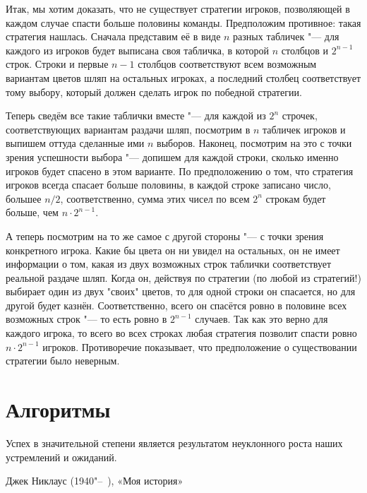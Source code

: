 \documentclass[twoside]{book}
\begin{document}
Итак, мы хотим доказать, что не существует стратегии игроков, позволяющей в каждом случае спасти больше половины команды.
Предположим противное: такая стратегия нашлась.
Сначала представим её в виде $n$ разных табличек "--- для каждого из игроков
будет выписана своя табличка, в которой $n$ столбцов и $2^{n-1}$ строк. Строки и первые $n-1$ столбцов соответствуют всем
возможным вариантам цветов шляп на остальных игроках, а последний столбец соответствует тому выбору, который
должен сделать игрок по победной стратегии. 

Теперь сведём все такие таблички вместе "--- для каждой из $2^n$ строчек, соответствующих вариантам раздачи шляп,
посмотрим в $n$ табличек игроков и выпишем оттуда сделанные ими $n$ выборов. Наконец, посмотрим на это
с точки зрения успешности выбора "--- допишем для каждой строки, сколько именно игроков будет спасено в этом варианте.
По предположению о том, что стратегия игроков всегда спасает больше половины, в каждой строке записано число, большее $n/2$,
соответственно, сумма этих чисел по всем $2^n$ строкам будет больше, чем $n\cdot 2^{n-1}$.

А теперь посмотрим на то же самое с другой стороны "--- с точки зрения конкретного игрока.
Какие бы цвета он ни увидел на остальных, он не имеет информации о том, какая из двух возможных строк таблички соответствует
реальной раздаче шляп. Когда он, действуя по стратегии (по любой из стратегий!) выбирает один из двух "своих" цветов, 
то для одной строки он спасается, но для другой будет казнён. Соответственно, всего он спасётся ровно в половине всех 
возможных строк "--- то есть ровно в $2^{n-1}$ случаев. Так как это верно для каждого игрока, то всего во всех строках 
любая стратегия позволит спасти ровно $n \cdot 2^{n-1}$ игроков. Противоречие показывает, что предположение
о существовании стратегии было неверным.


\chapter{Алгоритмы}


\setlength{\epigraphwidth}{.65\textwidth}
\epigraph{Успех в значительной степени является результатом неуклонного роста наших устремлений и ожиданий.\vspace{1ex}}{Джек Никлаус (1940"--~), «Моя история»}
\end{document}
